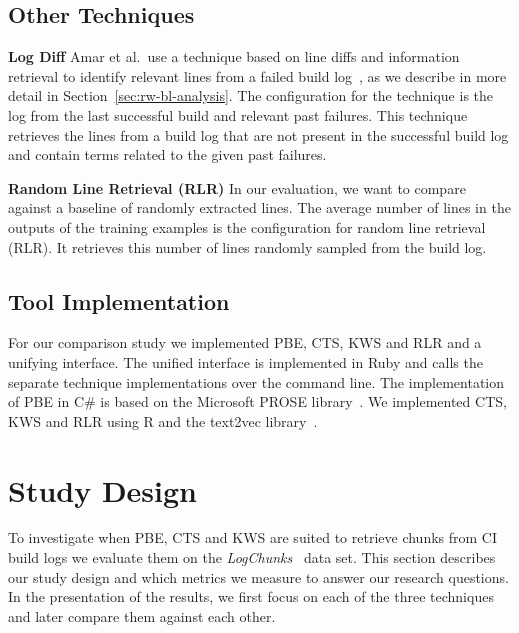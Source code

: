 \subsection{Other Techniques}
\label{sec:expl-rlr}

\noindent
\textbf{Log Diff}
Amar et al.\ use a technique based on line diffs and information retrieval to identify relevant lines from a failed build log~\cite{amar2019mining}, as we describe in more detail in Section~\ref{sec:rw-bl-analysis}.
The configuration for the technique is the log from the last successful build and relevant past failures.
This technique retrieves the lines from a build log that are not present in the successful build log and contain terms related to the given past failures.

\noindent
\textbf{Random Line Retrieval (RLR)}
In our evaluation, we want to compare against a baseline of randomly extracted lines.
The average number of lines in the outputs of the training examples is the configuration for random line retrieval (RLR).
It retrieves this number of lines randomly sampled from the build log.

\subsection{Tool Implementation}
For our comparison study we implemented PBE, CTS, KWS and RLR and a unifying interface.
The unified interface is implemented in Ruby and calls the separate technique implementations over the command line.
The implementation of PBE in C\# is based on the Microsoft PROSE library~\cite{prose2019webpage}.
We implemented CTS, KWS and RLR using R and the text2vec library~\cite{text2vec2019webpage}.


\section{Study Design}
\label{sec:study}
To investigate when PBE, CTS and KWS are suited to retrieve chunks from CI build
logs we evaluate them on the \emph{LogChunks}~\cite{brandt2020logchunks} data set.
This section describes our study design and which metrics we measure to answer our research questions.
In the presentation of the results, we first focus on each of the three techniques and later compare them against each other.

